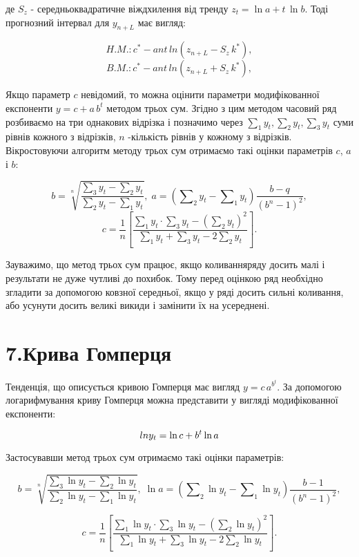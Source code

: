 \documentclass[a4paper, fontsize=10pt, oneside]{article}
\begin{document}
\noindent де $S_{z}$ - середньоквадратичне віждхилення від тренду $z_{t} = 	\ln{ a} + t\, \ln{b}.$
Тоді прогнозний інтервал для $y_{n+L}$ має вигляд:

$$H.M.: c^{*} - ant\,ln{(z_{n+L} - S_{z} \, k^{*})},$$
$$B.M.: c^{*} - ant\,ln{(z_{n+L} + S_{z} \, k^{*})},$$

Якщо параметр $c$ невідомий, то можна оцінити параметри модифікованної експоненти $y = c + a \, b^{t}$ методом трьох сум. Згідно з цим методом часовий ряд розбиваємо на три однакових відрізка і позначимо через $\sum_{1}y_{t}, \sum_{2}y_{t}, \sum_{3}y_{t}$ суми рівнів кожного з відрізків, $n$ -кількість рівнів у кожному з відрізків. Вікростовуючи алгоритм методу трьох сум отримаємо такі оцінки параметрів $c$, $a$ і $b$:

$$ b = \sqrt[n]{\frac{\sum_{3}y_{t} - \sum_{2}y_{t}}{\sum_{2}y_{t} - \sum_{1}y_{t}}},\; a = ( \sum\nolimits_{2} y_{t} - \sum\nolimits_{1} y_{t} ) \frac{b - q}{(b^{n} - 1)^2},$$
$$ c = \frac{1}{n} \left[ \frac{\sum_{1}y_{t} \cdot \sum_{3}y_{t} - (\sum_{2}y_{t})^2}{\sum_{1} y_{t} + \sum_{3} y_{t} - 2 \sum_{2}y_{t}} \right].$$

Зауважимо, що метод трьох сум працює, якщо коливанняряду досить малі і результати не дуже чутливі до похибок. Тому перед оцінкою ряд необхідно згладити за допомогою ковзної середньої, якщо у ряді досить сильні коливання, або усунути досить великі викиди і замінити їх на усереднені.

\chapter{\Large \bf 7.Крива Гомперця}

Тенденція, що описується кривою Гомперця має вигляд $y = c \, a^{b^{t}}.$ За допомогою логарифмування криву Гомперця можна представити у вигляді модифікованної експоненти:

$$\\ln{y_{t}} = \ln{c} + b^{t} \ln{a}$$

Застосувавши метод трьох сум отримаємо такі оцінки параметрів:

$$b = \sqrt[n]{\frac{\sum_{3}\ln{y_{t}} - \sum_{2}\ln{y_{t}}}{\sum_{2}\ln{y_{t}} - \sum_{1}\ln{y_{t}}}}, \; \ln{a} = \left(\sum\nolimits_{2}\ln{y_{t}} - \sum\nolimits_{1}\ln{y_{t}}\right)\frac{b-1}{(b^{n} - 1)^2},$$

$$ c = \frac{1}{n} \left[ \frac{\sum_{1}\ln{y_{t}} \cdot \sum_{3}\ln{y_{t}} - (\sum_{2}\ln{y_{t}})^2}{\sum_{1} \ln{y_{t}} + \sum_{3} \ln{y_{t}} - 2 \sum_{2}\ln{y_{t}}} \right].$$
\end{document}

